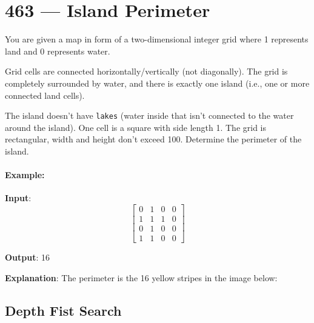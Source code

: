 \section{463 --- Island Perimeter}
You are given a map in form of a two-dimensional integer grid where 1 represents land and 0 represents water.

Grid cells are connected horizontally/vertically (not diagonally). The grid is completely surrounded by water, and there is exactly one island (i.e., one or more connected land cells).

The island doesn't have \texttt{lakes} (water inside that isn't connected to the water around the island). One cell is a square with side length 1. The grid is rectangular, width and height don't exceed 100. Determine the perimeter of the island.

 

\paragraph{Example:}

\begin{flushleft}
\textbf{Input}:
\[
\begin{bmatrix}
0 & 1 & 0 & 0 \\ 
 1 & 1 & 1 & 0 \\ 
 0 & 1 & 0 & 0 \\ 
 1 & 1 & 0 & 0
\end{bmatrix}
\]



\textbf{Output}: 16

\textbf{Explanation}: The perimeter is the 16 yellow stripes in the image below:

\begin{figure}[H]
\end{figure}
\end{flushleft}

\subsection{Depth Fist Search}

